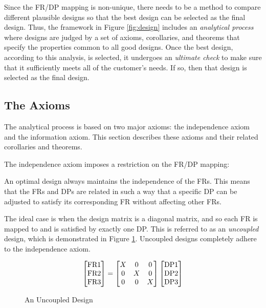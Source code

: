 Since the FR/DP mapping is non-unique, there needs to be a method to compare different plausible designs so that
the best design can be selected as the final design.  Thus, the framework in Figure \ref{fig:design} includes an
\emph{analytical process} where designs are judged by a set of axioms, corollaries, and theorems that specify the
properties common to all good designs.  Once the best design, according to this analysis, is selected, it undergoes
an \emph{ultimate check} to make sure that it sufficiently meets all of the customer's needs.  If so, then that
design is selected as the final design.

\subsection{The Axioms}

The analytical process is based on two major axioms: the independence axiom and the information axiom.  This section
describes these axioms and their related corollaries and theorems.

The independence axiom imposes a restriction on the FR/DP mapping:

\begin{axiom}[Independence]
  \label{axm:independ}
  An optimal design always maintains the independence of the FRs.  This means that the FRs and DPs are related in
  such a way that a specific DP can be adjusted to satisfy its corresponding FR without affecting other FRs.
\end{axiom}

The ideal case is when the design matrix is a diagonal matrix, and so each FR is mapped to and is satisfied by
exactly one DP.  This is referred to as an \emph{uncoupled} design, which is demonstrated in Figure
\ref{fig:uncoupled}.  Uncoupled designs completely adhere to the independence axiom.

\begin{figure}[h]
  \label{fig:uncoupled}
  \begin{equation*}
    \begin{bmatrix}
      \text{FR}1 \\ \text{FR}2 \\ \text{FR}3
    \end{bmatrix}=\begin{bmatrix}
    X & 0 & 0 \\
    0 & X & 0 \\
    0 & 0 & X \\
    \end{bmatrix}\begin{bmatrix}
      \text{DP}1 \\ \text{DP}2 \\ \text{DP}3
    \end{bmatrix}
  \end{equation*}
  \caption{An Uncoupled Design}
\end{figure}

